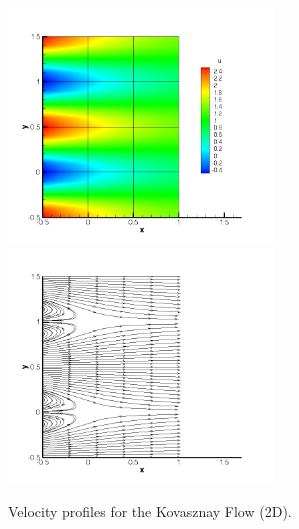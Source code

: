 \begin{figure}
\begin{center}
\includegraphics[width=7cm]{img/KF2DCVP8.png}
\includegraphics[width=7cm]{img/KF2DCVP8SL.png}
\caption{Velocity profiles for the Kovasznay Flow (2D).}
\label{f:incns:kovaflow}
\end{center}
\end{figure}

